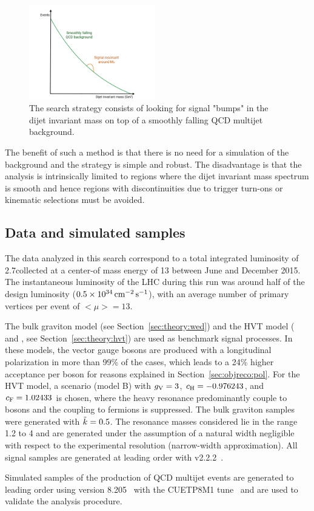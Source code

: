 \begin{figure}[h!] 
    \centering
    \includegraphics[width=0.49\textwidth]{figures/analysis/search1/misc/sigExtraction.pdf}
    \caption{The search strategy consists of looking for signal "bumps" in the dijet invariant mass on top of a smoothly falling QCD multijet background.}
    \label{fig:searchI:bumphunt}
\end{figure}
The benefit of such a method is that there is no need for a simulation of the background and the strategy is simple and robust. The disadvantage is that the analysis is intrinsically limited to regions where the dijet invariant mass spectrum is smooth and hence regions with discontinuities due to trigger turn-ons or kinematic selections must be avoided.

\subsection{Data and simulated samples}
\label{sec:searchI:samples}
The data analyzed in this search correspond to a total integrated luminosity of 2.7\fbinv collected at a center-of mass energy of 13 \TeV between June and December 2015. The instantaneous luminosity of the LHC during this run was around half of the design luminosity ($0.5 \times 10^{34} \,\text{cm}^\text{$-$2}\,\text{s}^\text{$-$1}$), with an average number of primary vertices per event of $<\mu>=13$. \par
The bulk graviton model (see Section~\ref{sec:theory:wed}) and the HVT model (\PWpr{} and \PZpr{}, see Section~\ref{sec:theory:hvt}) are used as benchmark signal processes. In these models, the vector gauge bosons are produced with a longitudinal polarization in more than 99\% of the cases, which leads to a 24\% higher acceptance per boson for reasons explained in Section~\ref{sec:objreco:pol}. For the HVT model, a scenario (model B) with $g_{\rm V}=3$, $c_{\rm H}=-0.976243$, and $c_{\rm F}=1.02433$ is chosen, where the heavy resonance predominantly couple to bosons and the coupling to fermions is suppressed. The bulk graviton samples were generated with $\tilde{k} = 0.5$. The resonance masses considered lie in the range 1.2 to 4 \TeV and are generated under the assumption of a natural width negligible with respect to the experimental resolution (narrow-width approximation). All signal samples are generated at leading order with \amcatnlo{} v2.2.2~\cite{Alwall:2014hca}. \par
Simulated samples of the production of QCD multijet events are generated to leading order using \PYTHIA version 8.205~\cite{Sjostrand:2007gs} with the CUETP8M1 tune~\cite{Khachatryan:2015pea} and are used to validate the analysis procedure.


